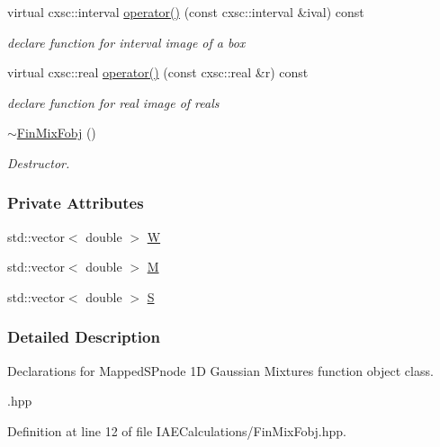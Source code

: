 \begin{DoxyCompactItemize}
virtual cxsc\-::interval \hyperlink{classFinMixFobj_a4361fc02de341dabfb65f38aad074519}{operator()} (const cxsc\-::interval \&ival) const 
\begin{DoxyCompactList}\small\item\em declare function for interval image of a box \end{DoxyCompactList}\item 
virtual cxsc\-::real \hyperlink{classFinMixFobj_abf3f0eb0845a534cf096926968f6746f}{operator()} (const cxsc\-::real \&r) const 
\begin{DoxyCompactList}\small\item\em declare function for real image of reals \end{DoxyCompactList}\item 
\hyperlink{classFinMixFobj_ab096a0e3d2acdd824aee0a5034b099f2}{$\sim$\-Fin\-Mix\-Fobj} ()
\begin{DoxyCompactList}\small\item\em \-Destructor. \end{DoxyCompactList}\end{DoxyCompactItemize}
\subsubsection*{\-Private \-Attributes}
\begin{DoxyCompactItemize}
\item 
std\-::vector$<$ double $>$ \hyperlink{classFinMixFobj_ab29696cdae37fc54efb50cd9a56420b7}{\-W}
\item 
std\-::vector$<$ double $>$ \hyperlink{classFinMixFobj_a2490d2fff0e490e621534ecbfcf3793c}{\-M}
\item 
std\-::vector$<$ double $>$ \hyperlink{classFinMixFobj_a791efb5c972de7c4399a743c1959db88}{\-S}
\end{DoxyCompactItemize}


\subsubsection{\-Detailed \-Description}
\-Declarations for \-Mapped\-S\-Pnode 1\-D \-Gaussian \-Mixtures function object class. 

.hpp 

\-Definition at line 12 of file \-I\-A\-E\-Calculations/\-Fin\-Mix\-Fobj.\-hpp.



